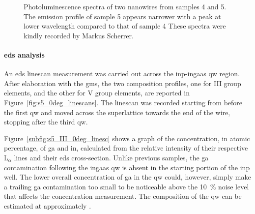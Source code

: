 \begin{figure}
    \centering
    \caption[Photoluminescence spectra of two nanowires from samples 4 and 5.]{Photoluminescence spectra of two nanowires from samples 4 and 5. The emission profile of sample 5 appears narrower with a peak at lower wavelength compared to that of sample 4 These spectra were kindly recorded by Markus Scherrer.}
    \label{fig:s5_pl}
\end{figure}

\paragraph{\acs{eds} analysis} An \acs{eds} linescan measurement was carried out across the \acs{inp}-\acs{ingaas} \acl{qw} region. After elaboration with the \acf{gms}, the two composition profiles, one for III group elements, and the other for V group elements, are reported in Figure~\ref{fig:s5_0deg_linescans}. The linescan was recorded starting from before the first \acl{qw} and moved across the superlattice towards the end of the wire, stopping after the third \acl{qw}.

Figure~\ref{subfig:s5_III_0deg_linesc} shows a graph of the concentration, in atomic percentage, of \acl{ga} and \acl{in}, calculated from the relative intensity of their respective L\(_\alpha\) lines and their \acs{eds} cross-section. Unlike previous samples, the \acl{ga} contamination following the \acs{ingaas} \acl{qw} is absent in the starting portion of the \acs{inp} well. The lower overall concentration of \acl{ga} in the \acl{qw} could, however, simply make a trailing \acl{ga} contamination too small to be noticeable above the \qty{10}{\%} noise level that affects the concentration measurement. The composition of the \acl{qw} can be estimated at approximately .

